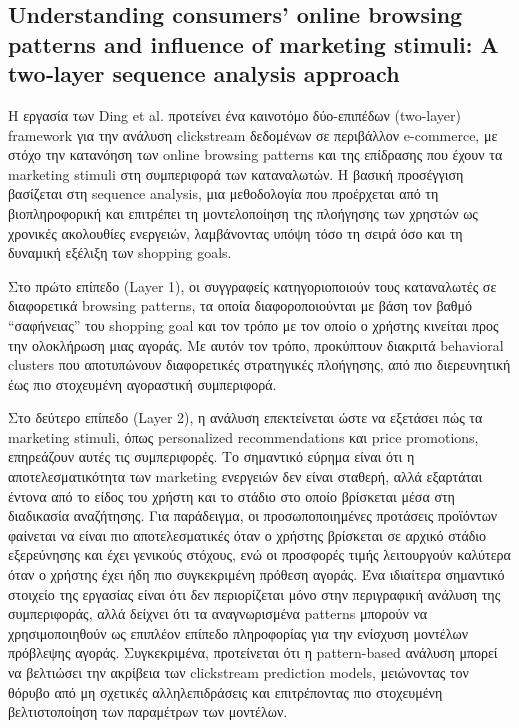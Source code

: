 \documentclass[12pt,a4paper]{article}
\begin{document}
	 \subsection{Understanding consumers’ online browsing patterns and influence of marketing stimuli: A two‑layer sequence analysis approach}
	 	
	 Η εργασία των Ding et al. \cite{Ding2025} προτείνει ένα καινοτόμο δύο-επιπέδων (two-layer) framework για την ανάλυση clickstream δεδομένων σε περιβάλλον e-commerce, με στόχο την κατανόηση των online browsing patterns και της επίδρασης που έχουν τα marketing stimuli στη συμπεριφορά των καταναλωτών. Η βασική προσέγγιση βασίζεται στη sequence analysis, μια μεθοδολογία που προέρχεται από τη βιοπληροφορική και επιτρέπει τη μοντελοποίηση της πλοήγησης των χρηστών ως χρονικές ακολουθίες ενεργειών, λαμβάνοντας υπόψη τόσο τη σειρά όσο και τη δυναμική εξέλιξη των shopping goals.
	 
	 Στο πρώτο επίπεδο (Layer 1), οι συγγραφείς κατηγοριοποιούν τους καταναλωτές σε διαφορετικά browsing patterns, τα οποία διαφοροποιούνται με βάση τον βαθμό “σαφήνειας” του shopping goal και τον τρόπο με τον οποίο ο χρήστης κινείται προς την ολοκλήρωση μιας αγοράς. Με αυτόν τον τρόπο, προκύπτουν διακριτά behavioral clusters που αποτυπώνουν διαφορετικές στρατηγικές πλοήγησης, από πιο διερευνητική έως πιο στοχευμένη αγοραστική συμπεριφορά.
	 
	 Στο δεύτερο επίπεδο (Layer 2), η ανάλυση επεκτείνεται ώστε να εξετάσει πώς τα marketing stimuli, όπως personalized recommendations και price promotions, επηρεάζουν αυτές τις συμπεριφορές. Το σημαντικό εύρημα είναι ότι η αποτελεσματικότητα των marketing ενεργειών δεν είναι σταθερή, αλλά εξαρτάται έντονα από το είδος του χρήστη και το στάδιο στο οποίο βρίσκεται μέσα στη διαδικασία αναζήτησης. Για παράδειγμα, οι προσωποποιημένες προτάσεις προϊόντων φαίνεται να είναι πιο αποτελεσματικές όταν ο χρήστης βρίσκεται σε αρχικό στάδιο εξερεύνησης και έχει γενικούς στόχους, ενώ οι προσφορές τιμής λειτουργούν καλύτερα όταν ο χρήστης έχει ήδη πιο συγκεκριμένη πρόθεση αγοράς.
	 Ένα ιδιαίτερα σημαντικό στοιχείο της εργασίας είναι ότι δεν περιορίζεται μόνο στην περιγραφική ανάλυση της συμπεριφοράς, αλλά δείχνει ότι τα αναγνωρισμένα patterns μπορούν να χρησιμοποιηθούν ως επιπλέον επίπεδο πληροφορίας για την ενίσχυση μοντέλων πρόβλεψης αγοράς. Συγκεκριμένα, προτείνεται ότι η pattern-based ανάλυση μπορεί να βελτιώσει την ακρίβεια των clickstream prediction models, μειώνοντας τον θόρυβο από μη σχετικές αλληλεπιδράσεις και επιτρέποντας πιο στοχευμένη βελτιστοποίηση των παραμέτρων των μοντέλων.
	 
\end{document}
